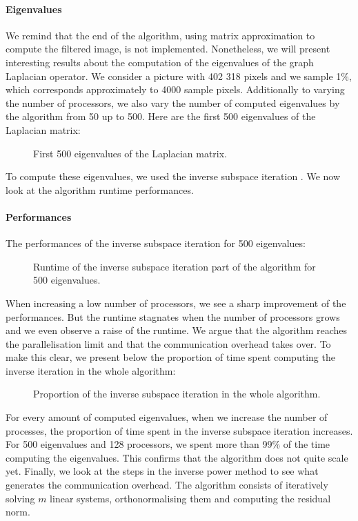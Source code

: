\paragraph{Eigenvalues}
We remind that the end of the algorithm, using matrix approximation to compute the filtered image, is not implemented.
Nonetheless, we will present interesting results about the computation of the eigenvalues of the graph Laplacian operator.
We consider a picture with 402 318 pixels and we sample 1\%, which corresponds approximately to 4000 sample pixels.
Additionally to varying the number of processors, we also vary the number of computed eigenvalues by the algorithm from 50 up to 500.
Here are the first 500 eigenvalues of the Laplacian matrix:

\begin{figure}[H]
  \centering
  
  \caption{First 500 eigenvalues of the Laplacian matrix.}
\end{figure}

To compute these eigenvalues, we used the inverse subspace iteration \cite{el_khoury_acceleration_2014}.
We now look at the algorithm runtime performances.

\paragraph{Performances}
The performances of the inverse subspace iteration for 500 eigenvalues:

\begin{figure}[H]
  \centering
  
  \caption{Runtime of the inverse subspace iteration part of the algorithm for 500 eigenvalues.}
\end{figure}

When increasing a low number of processors, we see a sharp improvement of the performances.
But the runtime stagnates when the number of processors grows and we even observe a raise of the runtime.
We argue that the algorithm reaches the parallelisation limit and that the communication overhead takes over.
To make this clear, we present below the proportion of time spent computing the inverse iteration in the whole algorithm:

\begin{figure}[H]
  \centering
  
  \caption{Proportion of the inverse subspace iteration in the whole algorithm.}
\end{figure}

For every amount of computed eigenvalues, when we increase the number of processes, the proportion of time spent in the inverse subspace iteration increases.
For 500 eigenvalues and 128 processors, we spent more than 99\% of the time computing the eigenvalues.
This confirms that the algorithm does not quite scale yet.
Finally, we look at the steps in the inverse power method to see what generates the communication overhead.
The algorithm consists of iteratively solving \(m\) linear systems, orthonormalising them and computing the residual norm.

